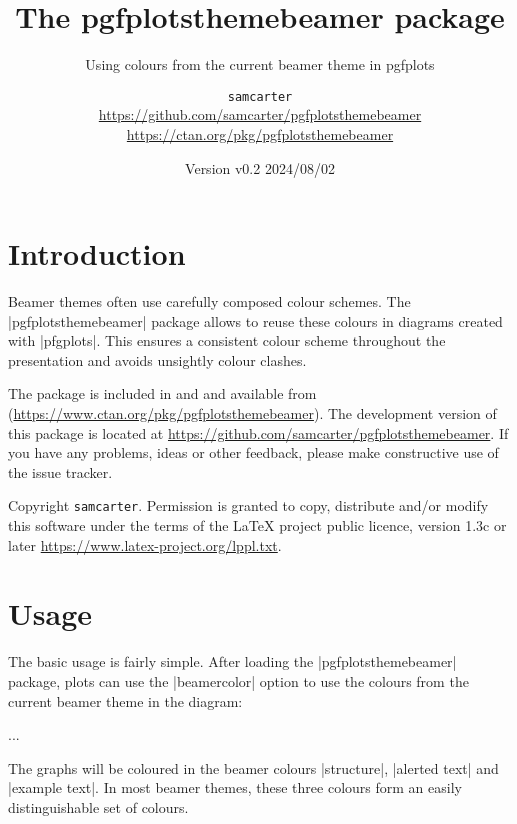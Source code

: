 \documentclass{scrartcl}
\title{The pgfplotsthemebeamer package}
\subtitle{Using colours from the current beamer theme in pgfplots}
\author{%
  \texorpdfstring{
    \texttt{samcarter}\\
    \url{https://github.com/samcarter/pgfplotsthemebeamer}\\
    \url{https://ctan.org/pkg/pgfplotsthemebeamer}
  }{samcarter}}
\date{Version v0.2 \textendash{} 2024/08/02}
\begin{document}
\maketitle

\section{Introduction}
\label{intro}

Beamer themes often use carefully composed colour schemes. The \saminline|pgfplotsthemebeamer| package allows to reuse these colours in diagrams created with \saminline|pfgplots|. This ensures a consistent colour scheme throughout the presentation and avoids unsightly colour clashes.

The package is included in \texlive and \miktex and available from \CTAN (\url{https://www.ctan.org/pkg/pgfplotsthemebeamer}).
The development version of this package is located at \url{https://github.com/samcarter/pgfplotsthemebeamer}. If you have any problems, ideas or other feedback, please make constructive use of the issue tracker.

Copyright  \texttt{samcarter}. Permission is granted to copy, distribute and\slash or modify this software under the terms of the LaTeX project public licence, version 1.3c or later \url{https://www.latex-project.org/lppl.txt}.

\section{Usage}

The basic usage is fairly simple. After loading the \saminline|pgfplotsthemebeamer| package, plots can use the \saminline|beamercolor| option to use the colours from the current beamer theme in the diagram:
\begin{tcolorbox}[title={Usage}]
\begin{samcode}
\usepackage{pgfplotsthemebeamer}

\begin{axis}[
  beamercolors
]
...
\end{axis}
\end{samcode}
\end{tcolorbox}
The graphs will be coloured in the beamer colours \saminline|structure|, \saminline|alerted text| and \saminline|example text|. In most beamer themes, these three colours form an easily distinguishable set of colours.
\end{document}
